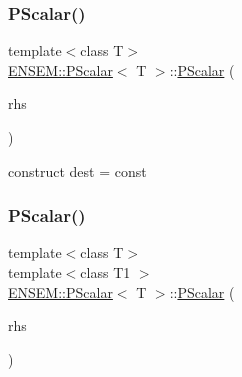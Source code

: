 \mbox{\label{classENSEM_1_1PScalar_aeb51f7fd0a7c5d9b7465ceabdb9311f8}} 
\subsubsection{\texorpdfstring{PScalar()}{PScalar()}\hspace{0.1cm}{\footnotesize\ttfamily [8/12]}}
{\footnotesize\ttfamily template$<$class T$>$ \\
\mbox{\hyperlink{classENSEM_1_1PScalar}{E\+N\+S\+E\+M\+::\+P\+Scalar}}$<$ T $>$\+::\mbox{\hyperlink{classENSEM_1_1PScalar}{P\+Scalar}} (\begin{DoxyParamCaption}\item[{const typename \mbox{\hyperlink{structENSEM_1_1WordType}{Word\+Type}}$<$ T $>$\+::Type\+\_\+t \&}]{rhs }\end{DoxyParamCaption})\hspace{0.3cm}{\ttfamily [inline]}}



construct dest = const 

\mbox{\label{classENSEM_1_1PScalar_a5dad766fb1a59a9e23d03b31f22916bb}} 
\subsubsection{\texorpdfstring{PScalar()}{PScalar()}\hspace{0.1cm}{\footnotesize\ttfamily [9/12]}}
{\footnotesize\ttfamily template$<$class T$>$ \\
template$<$class T1 $>$ \\
\mbox{\hyperlink{classENSEM_1_1PScalar}{E\+N\+S\+E\+M\+::\+P\+Scalar}}$<$ T $>$\+::\mbox{\hyperlink{classENSEM_1_1PScalar}{P\+Scalar}} (\begin{DoxyParamCaption}\item[{const \mbox{\hyperlink{classENSEM_1_1PScalar}{P\+Scalar}}$<$ T1 $>$ \&}]{rhs }\end{DoxyParamCaption})\hspace{0.3cm}{\ttfamily [inline]}}



